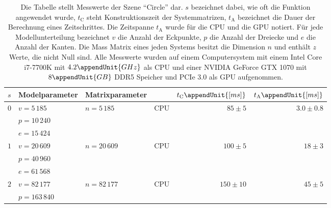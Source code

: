 \documentclass{article}
\begin{document}
    \begin{table}[h]
      \renewcommand{\arraystretch}{1.3}
      \footnotesize
      \center
      \caption{%
        Die Tabelle stellt Messwerte der Szene \enquote{Circle} dar.
        $s$ bezeichnet dabei, wie oft die Funktion  angewendet wurde, $t_\mathrm{C}$ steht Konstruktionszeit der Systemmatrizen, $t_\mathrm{A}$ bezeichnet die Dauer der Berechnung eines Zeitschrittes.
        Die Zeitspanne $t_\mathrm{A}$ wurde für die CPU und die GPU notiert.
        Für jede Modellunterteilung bezeichnet $v$ die Anzahl der Eckpunkte, $p$ die Anzahl der Dreiecke und $e$ die Anzahl der Kanten.
        Die Mass Matrix eines jeden Systems besitzt die Dimension $n$ und enthält $z$ Werte, die nicht Null sind.
        Alle Messwerte wurden auf einem Computersystem mit einem Intel Core i7-7700K mit $4.2\appendUnit{GHz}$ als CPU und einer NVIDIA GeForce GTX 1070 mit $8\appendUnit{GB}$ DDR5 Speicher und PCIe 3.0 als GPU aufgenommen.
      }
      \label{tab:results}
      \begin{tabular}{llllrr}
        \hline
        $s$ & Modelparameter & Matrixparameter & & $t_\mathrm{C}\appendUnit{[ms]}$ & $t_\mathrm{A}\appendUnit{[ms]}$ \\
        \hline
        \hline
        \multirow{3}{*}{$0$} & $v = 5\,185$ & \multirow{2}{*}{$n=5\,185$} & \multirow{2}{*}{CPU} & \multirow{2}{*}{$85\pm 5$} & \multirow{2}{*}{$3.0\pm 0.8$} \\
          & $p = 10\,240$ & \multirow{2}{*}{$z = 36\,033$} & \multirow{2}{*}{GPU} & \multirow{2}{*}{---} & \multirow{2}{*}{$2.35\pm 0.05$} \\
          & $e = 15\,424$ & & \\
        \hline
        \multirow{3}{*}{$1$} & $v = 20\,609$ & \multirow{2}{*}{$n=20\,609$} & \multirow{2}{*}{CPU} & \multirow{2}{*}{$100\pm 5$} & \multirow{2}{*}{$18\pm 3$} \\
          & $p = 40\,960$ & \multirow{2}{*}{$z = 143\,745$} & \multirow{2}{*}{GPU} & \multirow{2}{*}{---} & \multirow{2}{*}{$2.35\pm 0.05$} \\
          & $e = 61\,568$ & & \\
        \hline
        \multirow{3}{*}{$2$} & $v = 82\,177$ & \multirow{2}{*}{$n=82\,177$} & \multirow{2}{*}{CPU} & \multirow{2}{*}{$150\pm 10$} & \multirow{2}{*}{$45\pm 5$} \\
          & $p = 163\,840$ & \multirow{2}{*}{$z = 574\,209$} & \multirow{2}{*}{GPU} & \multirow{2}{*}{---} & \multirow{2}{*}{$2.20\pm 0.05$} \\

\end{tabular}
\end{table}
\end{document}
